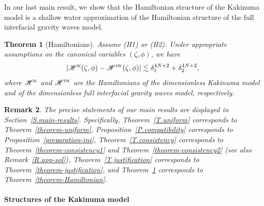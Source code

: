 \documentclass[11pt,leqno]{article}
\newtheorem{theorem}{\bf Theorem}[section]
\newtheorem{remark}[theorem]{\bf Remark}
\numberwithin{equation}{section}
\numberwithin{figure}{section}
\begin{document}
In our last main result, we show that the Hamiltonian structure of the Kakinuma model is a shallow water approximation of
the Hamiltonian structure of the full interfacial gravity waves model. 
\begin{theorem}[Hamiltonians]\label{T.Hamiltonian}
	Assume (H1) or (H2). Under appropriate assumptions on the canonical variables $(\zeta,\phi)$, we have
	\[
	|\mathscr{H}^{\mbox{\rm\tiny K}}(\zeta,\phi)-\mathscr{H}^{\mbox{\rm\tiny IW}}(\zeta,\phi)|
	\lesssim \delta_1^{4N+2}+\delta_2^{4N+2}, 
	\]
	where $\mathscr{H}^{\mbox{\rm\tiny K}}$ and $\mathscr{H}^{\mbox{\rm\tiny IW}}$ are the Hamiltonians of the dimensionless 
	Kakinuma model and of the dimensionless full interfacial gravity waves model, respectively.  
\end{theorem}

\begin{remark}
	The precise statements of our main results are displayed in Section~\ref{S.main-results}. Specifically, Theorem~\ref{T.uniform} corresponds to Theorem~\ref{theorem-uniform}, Proposition~\ref{P.compatibility} corresponds to Proposition~\ref{preparation-ini}, Theorem~\ref{T.consistency} corresponds to Theorem~\ref{theorem-consistency1} and Theorem~\ref{theorem-consistency2} (see also Remark~\ref{R.app-sol}), Theorem~\ref{T.justification} corresponds to Theorem~\ref{theorem-justification}, and Theorem~\ref{T.Hamiltonian} corresponds to Theorem~\ref{theorem-Hamiltonian}. 
\end{remark}


\paragraph{Structures of the Kakinuma model}
\end{document}
